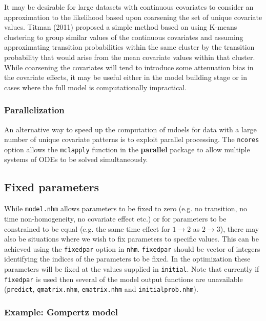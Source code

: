 \documentclass{article}
\numberwithin{equation}{section}
\begin{document}
It may be desirable for large datasets with continuous covariates to consider an approximation to the likelihood based upon coarsening the set of unique covariate values. Titman (2011) \cite{titman} proposed a simple method based on using K-means clustering to group similar values of the continuous covariates and assuming approximating transition probabilities within the same cluster by the transition probability that would arise from the mean covariate values within that cluster. While coarsening the covariates will tend to introduce some attenuation bias in the covariate effects, it may be useful either in the model building stage or in cases where the full model is computationally impractical.

\subsubsection{Parallelization}

An alternative way to speed up the computation of mdoels for data with a large number of unique covariate patterns is to exploit parallel processing. The \verb!ncores! option allows the \verb!mclapply! function in the {\bf parallel} package to allow multiple systems of ODEs to be solved simultaneously.

\subsection{Fixed parameters}

While \verb!model.nhm! allows parameters to be fixed to zero (e.g. no transition, no time non-homogeneity, no covariate effect etc.) or for parameters to be constrained to be equal (e.g. the same time effect for $1 \rightarrow 2$ as $2 \rightarrow 3$), there may also be situations where we wish to fix parameters to specific values. This can be achieved using the \verb!fixedpar! option in \verb!nhm!. \verb!fixedpar! should be vector of integers identifying the indices of the parameters to be fixed. In the optimization these parameters will be fixed at the values supplied in \verb!initial!.  Note that currently if \verb!fixedpar! is used then several of the model output functions are unavailable (\verb!predict!, \verb!qmatrix.nhm!, \verb!ematrix.nhm! and \verb!initialprob.nhm!).

\subsubsection{Example: Gompertz model}
\label{sec:gomp_model2}
\end{document}
